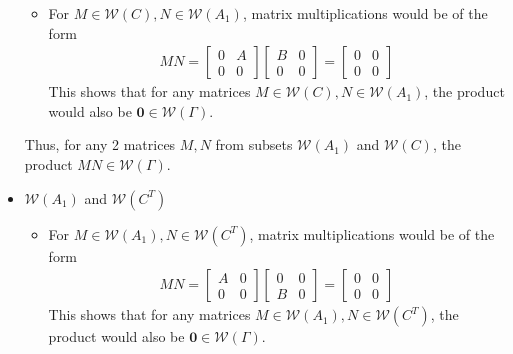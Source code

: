 \documentclass{article}
\begin{document}
\begin{itemize}
\begin{itemize}
        \item For $M\in\mathcal{W}(C),N \in \mathcal{W}(A_1)$, matrix multiplications would be of the form \\
        \begin{align*}
            MN = \begin{bmatrix}
                0 & A \\ 0 & 0
            \end{bmatrix}\begin{bmatrix}
                B&0\\0&0
            \end{bmatrix} = \begin{bmatrix}
                0&0\\0&0
            \end{bmatrix}
        \end{align*}
        This shows that for any matrices $M\in\mathcal{W}(C),N \in \mathcal{W}(A_1)$, the product would also be $\mathbf{0}\in\mathcal{W}(\Gamma)$.
    \end{itemize}
    Thus, for any 2 matrices $M,N$ from subsets $\mathcal{W}(A_1)$ and $\mathcal{W}(C)$, the product $MN \in \mathcal{W}(\Gamma)$.

    \item $\mathcal{W}(A_1)$ and $\mathcal{W}(C^T)$ \\
    \begin{itemize}
        \item For $M\in\mathcal{W}(A_1),N \in \mathcal{W}(C^T)$, matrix multiplications would be of the form \\
        \begin{align*}
            MN = \begin{bmatrix}
                A & 0 \\ 0 & 0
            \end{bmatrix}\begin{bmatrix}
                0&0\\B&0
            \end{bmatrix} = \begin{bmatrix}
                0&0\\0&0
            \end{bmatrix}
        \end{align*}
        This shows that for any matrices $M\in\mathcal{W}(A_1),N \in \mathcal{W}(C^T)$, the product would also be $\mathbf{0}\in\mathcal{W}(\Gamma)$.


\end{itemize}
\end{itemize}
\end{document}
